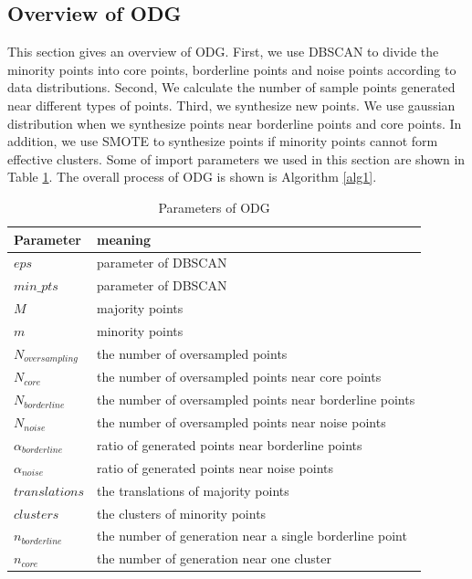 \documentclass[ida]{iosart2x}
\begin{document}
\subsection{Overview of ODG}
This section gives an overview of ODG. 
First, we use DBSCAN to divide the minority points into core points, 
borderline points and noise points according 
to data distributions. 
Second, We calculate the number of sample points generated near different types of points.
Third, we synthesize new points.
We use gaussian distribution when we synthesize points near borderline points and core points.
In addition, we use SMOTE to synthesize points if minority points cannot form effective clusters.
Some of import parameters we used in this section are shown in Table \ref{table15}.
The overall process of ODG is shown is Algorithm \ref{alg1}.
\begin{table}[]
  \caption{Parameters of ODG}
  \label{table15}
  \begin{tabular}{ll}
  \hline
  Parameter             & meaning                                                 \\ \hline
  $eps$                 & parameter of DBSCAN                                     \\
  $min\_pts$            & parameter of DBSCAN                                     \\
  $M$                   & majority points                                         \\
  $m$                   & minority points                                         \\
  $N_{oversampling}$    & the number of oversampled points                        \\
  $N_{core}$            & the number of oversampled points near core points       \\
  $N_{borderline}$      & the number of oversampled points near borderline points \\
  $N_{noise}$           & the number of oversampled points near noise points      \\
  $\alpha_{borderline}$ & ratio of generated points near borderline points        \\
  $\alpha_{noise}$      & ratio of generated points near noise points             \\
  $translations$        & the translations of majority points                     \\
  $clusters$            & the clusters of minority points                         \\ 
  $n_{borderline}$      & the number of generation near a single borderline point \\ 
  $n_{core}$            & the number of generation near one cluster               \\ \hline
  \end{tabular}
  \end{table}
\end{document}
